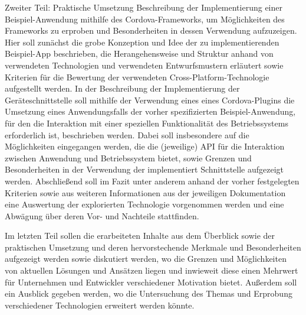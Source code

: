 Zweiter Teil: Praktische Umsetzung
	Beschreibung der Implementierung einer Beispiel-Anwendung mithilfe des Cordova-Frameworks, um Möglichkeiten des Frameworks zu erproben und Besonderheiten in dessen Verwendung aufzuzeigen.
	Hier soll zunächst die grobe Konzeption und Idee der zu implementierenden Beispiel-App beschrieben, die Herangehensweise und Struktur anhand von verwendeten Technologien und verwendeten Entwurfsmustern erläutert sowie Kriterien für die Bewertung der verwendeten Cross-Platform-Technologie aufgestellt werden.
	In der Beschreibung der Implementierung der Geräteschnittstelle soll mithilfe der Verwendung eines eines Cordova-Plugins die Umsetzung eines Anwendungsfalls der vorher spezifizierten Beispiel-Anwendung, für den die Interaktion mit einer speziellen Funktionalität des Betriebssystems erforderlich ist, beschrieben werden.
	Dabei soll insbesondere auf die Möglichkeiten eingegangen werden, die die (jeweilige) API für die Interaktion zwischen Anwendung und Betriebssystem bietet, sowie Grenzen und Besonderheiten in der Verwendung der implementiert Schnittstelle aufgezeigt werden.
	Abschließend soll im Fazit unter anderem anhand der vorher festgelegten Kriterien sowie aus weiteren Informationen aus der jeweiligen Dokumentation eine Auswertung der explorierten Technologie vorgenommen werden und eine Abwägung über deren Vor- und Nachteile stattfinden.


Im letzten Teil  sollen die erarbeiteten Inhalte aus dem Überblick sowie der praktischen Umsetzung und deren hervorstechende Merkmale und Besonderheiten aufgezeigt werden sowie diskutiert werden, wo die Grenzen und Möglichkeiten von aktuellen Lösungen und Ansätzen liegen und inwieweit diese einen Mehrwert für Unternehmen und Entwickler verschiedener Motivation bietet.
Außerdem soll ein Ausblick gegeben werden, wo die Untersuchung des Themas und Erprobung verschiedener Technologien erweitert werden könnte.

